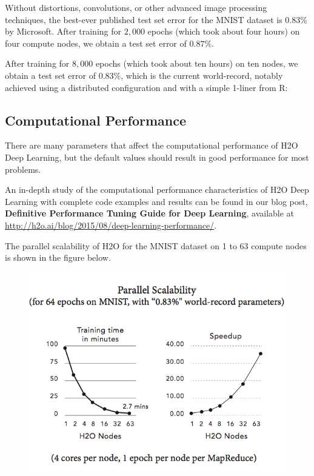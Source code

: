 {{Without distortions, convolutions, or other advanced image processing techniques, the best-ever published test set error for the MNIST dataset is $0.83$\% by Microsoft. After training for $2,000$ epochs (which took about four hours) on four compute nodes, we obtain a test set error of $0.87\%$. 

After training for $8,000$ epochs (which took about ten hours) on ten nodes, we obtain a test set error of $0.83\%$, which is the current world-record, notably achieved using a distributed configuration and with a simple 1-liner from R:

\waterExampleInR


\subsection{Computational Performance}
There are many parameters that affect the computational performance of H2O Deep Learning, but the default values should result in good performance for most problems. 

An in-depth study of the computational performance characteristics of H2O Deep Learning with complete code examples and results can be found in our blog post, \textbf{Definitive Performance Tuning Guide for Deep Learning}, available at \url{http://h2o.ai/blog/2015/08/deep-learning-performance/}.

The parallel scalability of H2O for the MNIST dataset on 1 to 63 compute nodes is shown in the figure below.
\begin{figure}[h!]
\centering
\includegraphics[scale=0.6]{scalability_new.png}
\end{figure}

}}
